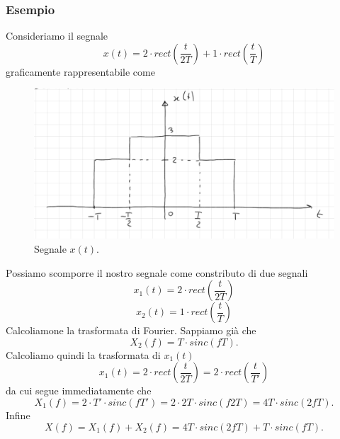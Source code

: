 \documentclass[12pt,oneside,openany]{memoir}
\numberwithin{equation}{subsection}
\begin{document}
\subsubsection{Esempio}
Consideriamo il segnale
\[
	x(t) = 2 \cdot rect\left(\frac{t}{2T}\right) +
	1 \cdot rect\left(\frac{t}{T}\right)
\]
graficamente rappresentabile come
\begin{figure}[H]
	\centering
	\captionsetup{justification=centering}
	\includegraphics[width=1.0\textwidth]{images/esempio_14_03_2018.png}
	\caption{Segnale $x(t)$.}
\end{figure}
\noindent
Possiamo scomporre il nostro segnale come constributo di due segnali
\[
	x_1(t) = 2 \cdot rect\left(\frac{t}{2T}\right)
\]
\[
	x_2(t) = 1 \cdot rect\left(\frac{t}{T}\right)
\]
Calcoliamone la trasformata di Fourier.
\bigbreak\noindent
Sappiamo gi\`a che 
\[
	X_2(f) = T \cdot sinc(f T).
\]
Calcoliamo quindi la trasformata di $x_1(t)$
\[
	x_1(t) = 2 \cdot rect\left(\frac{t}{2T}\right) =
	2 \cdot rect\left(\frac{t}{T'}\right)
\]
da cui segue immediatamente che
\[
	X_1(f) = 2 \cdot T' \cdot sinc(f T') =
	2 \cdot 2T \cdot sinc(f 2T) =
	4T \cdot sinc(2 f T).
\]
Infine
\[
	X(f) = X_1(f) + X_2(f) =
	4T \cdot sinc(2 f T) + T \cdot sinc(f T).
\]

\end{document}
